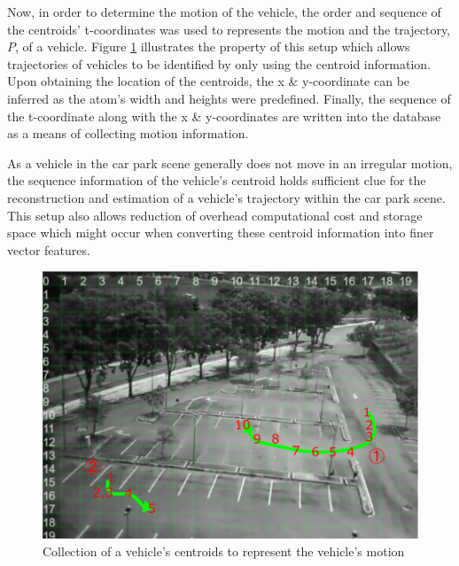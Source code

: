 Now, in order to determine the motion of the vehicle, the order and sequence of the centroids' t-coordinates was used to represents the motion and the trajectory, $P$, of a vehicle. Figure \ref{fig:motionExample} illustrates the property of this setup which allows trajectories of vehicles to be identified by only using the centroid information. Upon obtaining the location of the centroids, the x \& y-coordinate can be inferred as the atom's width and heights were predefined. Finally, the sequence of the t-coordinate along with the x \& y-coordinates are written into the database as a means of collecting motion information.

As a vehicle in the car park scene generally does not move in an irregular motion, the sequence information of the vehicle's centroid holds sufficient clue for the reconstruction and estimation of a vehicle's trajectory within the car park scene. This setup also allows reduction of overhead computational cost and storage space which might occur when converting these centroid information into finer vector features. 


\begin{figure}[hbt!]\centering
\includegraphics[width=.9\textwidth]{image/general/trajectorysample2.png}
\caption{Collection of a vehicle's centroids to represent the vehicle's motion}
\label{fig:motionExample}
\end{figure}
